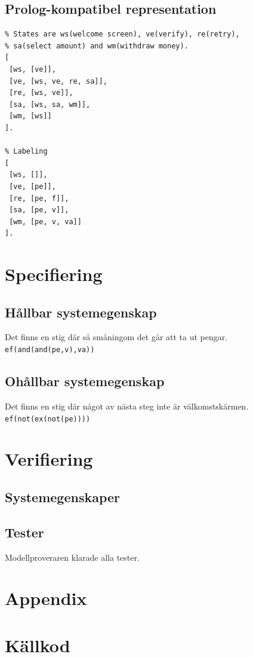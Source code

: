 \documentclass[]{article}
\begin{document}
\clearpage
\subsection{Prolog-kompatibel representation}
\begin{verbatim}
% States are ws(welcome screen), ve(verify), re(retry), 
% sa(select amount) and wm(withdraw money).
[
 [ws, [ve]],
 [ve, [ws, ve, re, sa]],
 [re, [ws, ve]],
 [sa, [ws, sa, wm]],
 [wm, [ws]]
].

% Labeling
[
 [ws, []],
 [ve, [pe]],
 [re, [pe, f]],
 [sa, [pe, v]],
 [wm, [pe, v, va]]
].
\end{verbatim}

\clearpage
\section{Specifiering}

\subsection{Hållbar systemegenskap}
Det finns en stig där så småningom det går att ta ut pengar.\\
\texttt{ef(and(and(pe,v),va))}

\subsection{Ohållbar systemegenskap}
Det finns en stig där något av nästa steg inte är välkomstskärmen.\\
\texttt{ef(not(ex(not(pe))))}

\section{Verifiering}
\subsection{Systemegenskaper}

\subsection{Tester}
Modellproveraren klarade alla tester.

\clearpage
\section*{Appendix}
\appendix

\section{Källkod}

%
\end{document}
